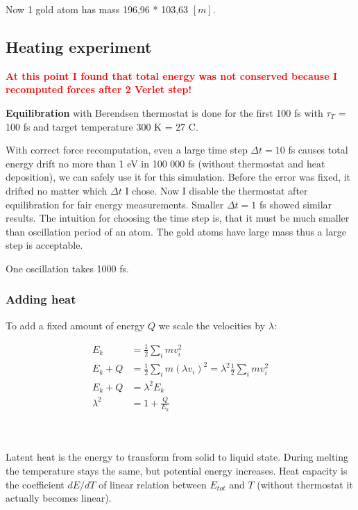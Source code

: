 \documentclass[12pt,a4paper]{article}
\newcommand{\framed}[1]{\tikz[baseline=(char.base)]{\node[shape=rectangle,draw,inner sep=4pt] (char) {#1};}}
\begin{document}
Now 1 gold atom has mass 196,96 * 103,63 $[m]$.

\subsection*{Heating experiment}

\textcolor{red}{\large\bf At this point I found that total energy was not conserved because I recomputed forces after 2 Verlet step!}

{\bf Equilibration} with Berendsen thermostat is done for the first 100 fs with $\tau_T$ = 100 fs and target temperature 300 K = 27 C.

With correct force recomputation, even a large time step $\Delta t=10$ fs causes total energy drift no more than 1 eV in 100 000 fs (without thermostat and heat deposition), we can safely use it for this simulation. Before the error was fixed, it drifted no matter which $\Delta t$ I chose. Now I disable the thermostat after equilibration for fair energy measurements. Smaller $\Delta t = 1$ fs showed similar results. The intuition for choosing the time step is, that it must be much smaller than oscillation period of an atom. The gold atoms have large mass thus a large step is acceptable.

One oscillation takes 1000 fs.

\subsubsection*{Adding heat}

To add a fixed amount of energy $Q$ we scale the velocities by $\lambda$:

\[
\begin{aligned}
	E_k &= \frac{1}{2} \sum_i m v_i^2 \\
	E_k + Q &= \frac{1}{2} \sum_i m (\lambda v_i)^2 = \lambda^2 \frac{1}{2} \sum_i m v_i^2 \\
	E_k + Q &= \lambda^2 E_k \\
	\lambda^2 &= 1 + \frac{Q}{E_k} \\
\end{aligned}
\]

{\centering\framed{ \( \lambda = \sqrt{1 + \frac{Q}{E_k}} \) }\\}

Latent heat is the energy to transform from solid to liquid state. During melting the temperature stays the same, but potential energy increases. Heat capacity is the coefficient $dE/dT$ of linear relation between $E_{tot}$ and $T$ (without thermostat it actually becomes linear).
\end{document}
